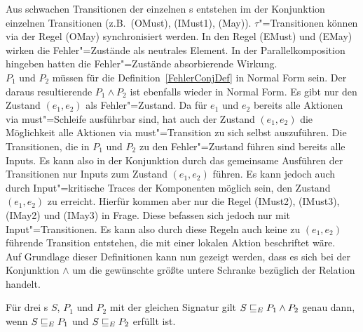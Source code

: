 Aus schwachen Transitionen der einzelnen \MEIO{}s entstehen im der Konjunktion
einzelnen Transitionen (z.B.\ (OMust), (IMust1), (May)). $\tau$"=Transitionen
können via der Regel (OMay) synchronisiert werden. In den Regel (EMust) und
(EMay) wirken die Fehler"=Zustände als neutrales Element. In der
Parallelkomposition hingeben hatten die Fehler"=Zustände absorbierende
Wirkung.\\
$P_1$ und $P_2$ müssen für die Definition~\ref{FehlerConjDef} in Normal Form sein.
Der daraus resultierende \MEIO{} $P_1\land P_2$ ist ebenfalls wieder in Normal
Form. Es gibt nur den Zustand $(e_1,e_2)$ als Fehler"=Zustand. Da für $e_1$ und
$e_2$ bereits alle Aktionen via must"=Schleife ausführbar sind, hat auch der
Zustand $(e_1,e_2)$ die Möglichkeit alle Aktionen via must"=Transition zu sich
selbst auszuführen. Die Transitionen, die in $P_1$ und $P_2$ zu den
Fehler"=Zustand führen sind bereits alle Inputs. Es kann also in der
Konjunktion durch das gemeinsame Ausführen der Transitionen nur Inputs zum
Zustand $(e_1,e_2)$ führen. Es kann jedoch auch durch Input"=kritische Traces
der Komponenten möglich sein, den Zustand $(e_1,e_2)$ zu erreicht. Hierfür
kommen aber nur die Regel (IMust2), (IMust3), (IMay2) und (IMay3) in Frage.
Diese befassen sich jedoch nur mit Input"=Transitionen. Es kann also durch
diese Regeln auch keine zu $(e_1,e_2)$ führende Transition entstehen, die mit
einer lokalen Aktion beschriftet wäre.\\
Auf Grundlage dieser Definitionen kann nun gezeigt werden, dass es sich bei der
Konjunktion $\land$ um die gewünschte größte untere Schranke bezüglich der
Relation \ERel{} handelt.

\begin{Satz}[Konjunktion]
  \label{FehlerConjSatz}
  Für drei \MEIO{}s $S$, $P_1$ und $P_2$ mit der gleichen Signatur gilt
  $S \sqsubseteq  _E P_1\land P_2$ genau dann, wenn $S \sqsubseteq  _E P_1$ und $S \sqsubseteq  _E P_2$ erfüllt
  ist.
\end{Satz}

